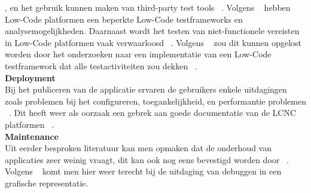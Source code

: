 , en het gebruik kunnen maken van third-party test tools  ~\autocite{Rokis_2022}. Volgens ~\textcite{Rokis_2022} hebben Low-Code platformen een beperkte Low-Code testframeworks en analysemogelijkheden.
Daarnaast wordt het testen van niet-functionele vereisten in Low-Code platformen vaak verwaarloosd ~\autocite{Rokis_2022}.
Volgens ~\textcite{Rokis_2022} zou dit kunnen opgelost worden door het onderzoeken naar een implementatie van een Low-Code testframework dat alle testactiviteiten zou dekken ~\autocite{Rokis_2022}.
\\
\textbf{Deployment}
\\
Bij het publiceren van de applicatie ervaren de gebruikers enkele uitdagingen zoals problemen bij het configureren, toegankelijkheid, en performantie problemen ~\autocite{Rokis_2022}.
Dit heeft weer als oorzaak een gebrek aan goede documentatie van de LCNC platformen ~\autocite{Rokis_2022}.
\\
\textbf{Maintenance}
\\
Uit eerder besproken literatuur kan men opmaken dat de onderhoud van applicaties zeer weinig vraagt, dit kan ook nog eens bevestigd worden door ~\textcite{Rokis_2022}.
Volgens ~\textcite{Rokis_2022} komt men hier weer terecht bij de uitdaging van debuggen in een grafische representatie.


